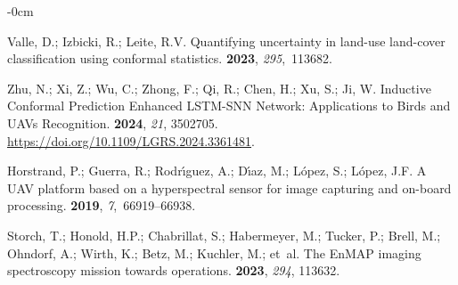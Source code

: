 \documentclass[remotesensing,article,accept,pdftex,moreauthors]{Definitions/mdpi}
\begin{document}
\begin{adjustwidth}{-\extralength}{0cm}
\begin{thebibliography}{999}
Valle, D.; Izbicki, R.; Leite, R.V.
\newblock Quantifying uncertainty in land-use land-cover classification using
  conformal statistics.
 {\bf 2023}, {\em 295},~113682.

Zhu, N.; Xi, Z.; Wu, C.; Zhong, F.; Qi, R.; Chen, H.; Xu, S.; Ji, W.
\newblock Inductive Conformal Prediction Enhanced LSTM-SNN Network:
  Applications to Birds and UAVs Recognition.
 {\bf 2024}, \emph{21}, 3502705. \url{https://doi.org/10.1109/LGRS.2024.3361481}.

Horstrand, P.; Guerra, R.; Rodr{\'\i}guez, A.; D{\'\i}az, M.; L{\'o}pez, S.;
  L{\'o}pez, J.F.
\newblock A UAV platform based on a hyperspectral sensor for image capturing
  and on-board processing.
 {\bf 2019}, {\em 7},~66919--66938.

Storch, T.; Honold, H.P.; Chabrillat, S.; Habermeyer, M.; Tucker, P.; Brell,
  M.; Ohndorf, A.; Wirth, K.; Betz, M.; Kuchler, M.;  et~al.
\newblock The EnMAP imaging spectroscopy mission towards operations.
 {\bf 2023}, \emph{294}, 113632.

\end{thebibliography}



%


\end{adjustwidth}
\end{document}

